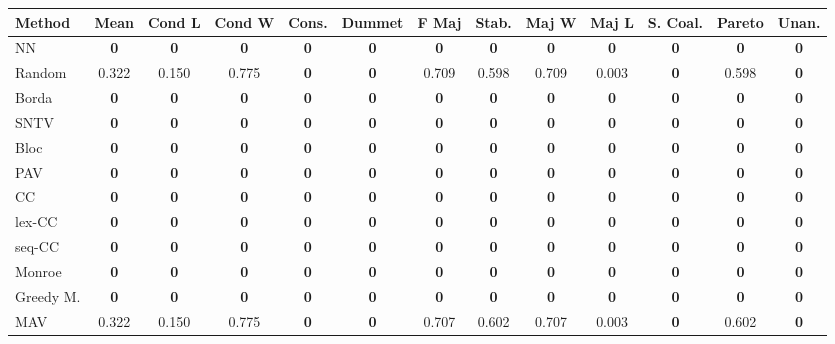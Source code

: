\begin{tabular}{lcccccccccccc}
\toprule
Method & Mean & Cond L & Cond W & Cons. & Dummet & F Maj & Stab. & Maj W & Maj L & S. Coal. & Pareto & Unan. \\
\midrule
NN & \textbf{0} & \textbf{0} & \textbf{0} & \textbf{0} & \textbf{0} & \textbf{0} & \textbf{0} & \textbf{0} & \textbf{0} & \textbf{0} & \textbf{0} & \textbf{0} \\
Random & 0.322 & 0.150 & 0.775 & \textbf{0} & \textbf{0} & 0.709 & 0.598 & 0.709 & 0.003 & \textbf{0} & 0.598 & \textbf{0} \\
Borda & \textbf{0} & \textbf{0} & \textbf{0} & \textbf{0} & \textbf{0} & \textbf{0} & \textbf{0} & \textbf{0} & \textbf{0} & \textbf{0} & \textbf{0} & \cellcolor{green!25}\textbf{0} \\
SNTV & \textbf{0} & \textbf{0} & \textbf{0} & \cellcolor{green!25}\textbf{0} & \textbf{0} & \textbf{0} & \textbf{0} & \cellcolor{green!25}\textbf{0} & \textbf{0} & \cellcolor{green!25}\textbf{0} & \textbf{0} & \textbf{0} \\
Bloc & \textbf{0} & \textbf{0} & \textbf{0} & \textbf{0} & \textbf{0} & \cellcolor{green!25}\textbf{0} & \textbf{0} & \textbf{0} & \textbf{0} & \textbf{0} & \cellcolor{green!25}\textbf{0} & \cellcolor{green!25}\textbf{0} \\
PAV & \textbf{0} & \textbf{0} & \textbf{0} & \textbf{0} & \textbf{0} & \textbf{0} & \textbf{0} & \textbf{0} & \textbf{0} & \textbf{0} & \cellcolor{green!25}\textbf{0} & \textbf{0} \\
CC & \textbf{0} & \textbf{0} & \textbf{0} & \cellcolor{green!25}\textbf{0} & \textbf{0} & \textbf{0} & \textbf{0} & \textbf{0} & \textbf{0} & \textbf{0} & \textbf{0} & \textbf{0} \\
lex-CC & \textbf{0} & \textbf{0} & \textbf{0} & \textbf{0} & \textbf{0} & \textbf{0} & \textbf{0} & \textbf{0} & \textbf{0} & \textbf{0} & \textbf{0} & \textbf{0} \\
seq-CC & \textbf{0} & \textbf{0} & \textbf{0} & \textbf{0} & \textbf{0} & \textbf{0} & \textbf{0} & \textbf{0} & \textbf{0} & \textbf{0} & \textbf{0} & \textbf{0} \\
Monroe & \textbf{0} & \textbf{0} & \textbf{0} & \cellcolor{green!25}\textbf{0} & \textbf{0} & \textbf{0} & \textbf{0} & \textbf{0} & \textbf{0} & \textbf{0} & \textbf{0} & \cellcolor{green!25}\textbf{0} \\
Greedy M. & \textbf{0} & \textbf{0} & \textbf{0} & \cellcolor{green!25}\textbf{0} & \textbf{0} & \textbf{0} & \textbf{0} & \textbf{0} & \textbf{0} & \cellcolor{green!25}\textbf{0} & \textbf{0} & \cellcolor{green!25}\textbf{0} \\
MAV & 0.322 & 0.150 & 0.775 & \textbf{0} & \textbf{0} & 0.707 & 0.602 & 0.707 & 0.003 & \textbf{0} & 0.602 & \textbf{0} \\
\bottomrule
\end{tabular}
